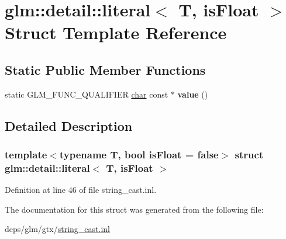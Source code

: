 \hypertarget{structglm_1_1detail_1_1literal}{}\section{glm\+:\+:detail\+:\+:literal$<$ T, is\+Float $>$ Struct Template Reference}
\label{structglm_1_1detail_1_1literal}
\subsection*{Static Public Member Functions}
\begin{DoxyCompactItemize}
\item 
\mbox{\label{structglm_1_1detail_1_1literal_a14fd9d6fec8d35f7a2fd3b0095d17b6a}} 
static G\+L\+M\+\_\+\+F\+U\+N\+C\+\_\+\+Q\+U\+A\+L\+I\+F\+I\+ER \hyperlink{classchar}{char} const  $\ast$ {\bfseries value} ()
\end{DoxyCompactItemize}


\subsection{Detailed Description}
\subsubsection*{template$<$typename T, bool is\+Float = false$>$\newline
struct glm\+::detail\+::literal$<$ T, is\+Float $>$}



Definition at line 46 of file string\+\_\+cast.\+inl.



The documentation for this struct was generated from the following file\+:\begin{DoxyCompactItemize}
\item 
deps/glm/gtx/\hyperlink{string__cast_8inl}{string\+\_\+cast.\+inl}\end{DoxyCompactItemize}
